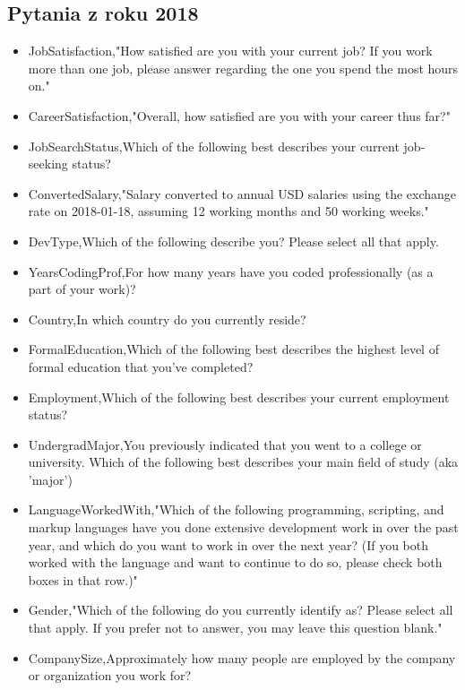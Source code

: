 \begin{appendices}
    \section{Pytania z roku 2018}\label{pytania-2018}

    \begin{itemize}
        \item JobSatisfaction,"How satisfied are you with your current job? If you work more than one job, please answer regarding the one you spend the most hours on."
        \item CareerSatisfaction,"Overall, how satisfied are you with your career thus far?"
        \item JobSearchStatus,Which of the following best describes your current job-seeking status?
        \item ConvertedSalary,"Salary converted to annual USD salaries using the exchange rate on 2018-01-18, assuming 12 working months and 50 working weeks."
        \item DevType,Which of the following describe you? Please select all that apply.
        \item YearsCodingProf,For how many years have you coded professionally (as a part of your work)?
        \item Country,In which country do you currently reside?
        \item FormalEducation,Which of the following best describes the highest level of formal education that you’ve completed?
        \item Employment,Which of the following best describes your current employment status?
        \item UndergradMajor,You previously indicated that you went to a college or university. Which of the following best describes your main field of study (aka 'major')
        \item LanguageWorkedWith,"Which of the following programming, scripting, and markup languages have you done extensive development work in over the past year, and which do you want to work in over the next year?  (If you both worked with the language and want to continue to do so, please check both boxes in that row.)"
        \item Gender,"Which of the following do you currently identify as? Please select all that apply. If you prefer not to answer, you may leave this question blank."
        \item CompanySize,Approximately how many people are employed by the company or organization you work for?

\end{itemize}
\end{appendices}
